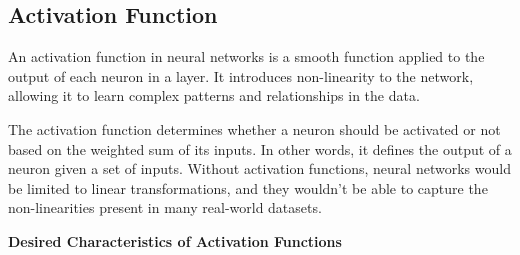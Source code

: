 \documentclass{tufte-handout}
\begin{document}
\subsection{Activation Function}%
  \label{sub:ActivationFunction}
An activation function in neural networks is a smooth function applied to the output of each neuron in a layer. It introduces non-linearity to the network, allowing it to learn complex patterns and relationships in the data.

The activation function determines whether a neuron should be activated or not based on the weighted sum of its inputs. In other words, it defines the output of a neuron given a set of inputs. Without activation functions, neural networks would be limited to linear transformations, and they wouldn't be able to capture the non-linearities present in many real-world datasets. 

\vspace{5mm}
\noindent \textbf{Desired Characteristics of Activation Functions} \cite{jagtap2022important}
\end{document}
